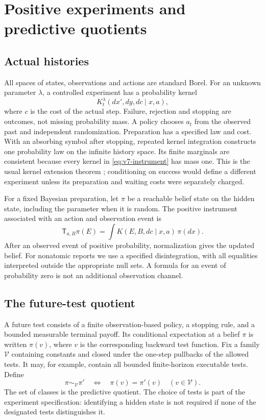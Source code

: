 \section{Positive experiments and predictive quotients}\label{sec:v7-experiments}
\subsection{Actual histories}
All spaces of states, observations and actions are standard Borel.
For an unknown parameter $\lambda$, a controlled experiment has a
probability kernel
\begin{equation}
 K_t^\lambda(dx',dy,dc\mid x,a),                         \label{eq:v7-instrument}
\end{equation}
where $c$ is the cost of the actual step. Failure, rejection and stopping
are outcomes, not missing probability mass. A policy chooses $a_t$ from
the observed past and independent randomization. Preparation has a
specified law and cost. With an absorbing symbol after stopping, repeated
kernel integration constructs one probability law on the infinite
history space. Its finite marginals are consistent because every kernel
in \eqref{eq:v7-instrument} has mass one. This is the usual kernel
extension theorem \cite{Kallenberg2021}; conditioning on success would
define a different experiment unless its preparation and waiting costs
were separately charged.

For a fixed Bayesian preparation, let $\pi$ be a reachable belief state
on the hidden state, including the parameter when it is random. The
positive instrument associated with an action and observation event is
\[
 \mathsf T_{a,B}\pi(E)=\int K(E,B,dc\mid x,a)\,\pi(dx).
\]
After an observed event of positive probability, normalization gives the
updated belief. For nonatomic reports we use a specified disintegration,
with all equalities interpreted outside the appropriate null sets. A
formula for an event of probability zero is not an additional observation
channel.

\subsection{The future-test quotient}
A future test consists of a finite observation-based policy, a stopping
rule, and a bounded measurable terminal payoff. Its conditional
expectation at a belief $\pi$ is written $\pi(v)$, where $v$ is the
corresponding backward test function. Fix a family $\mathcal V$ containing
constants and closed under the one-step pullbacks of the allowed tests.
It may, for example, contain all bounded finite-horizon executable tests.
Define
\begin{equation}
 \pi\sim_{\mathcal V}\pi'
 \quad\Longleftrightarrow\quad
 \pi(v)=\pi'(v)\quad(v\in\mathcal V).                   \label{eq:v7-quotient}
\end{equation}
The set of classes is the predictive quotient. The choice of tests is
part of the experiment specification: identifying a hidden state is not
required if none of the designated tests distinguishes it.

